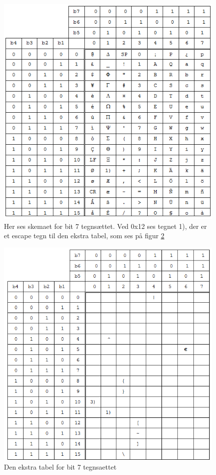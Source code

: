 \begin{figure}[H]
\includegraphics []{Billeder/tegnsaet.png}
\caption {Her ses skemaet for bit 7 tegnsættet. Ved 0x12 ses tegnet 1), der er et escape tegn til den ekstra tabel, som ses på figur \ref{tegnsaet2}}
\label {tegnsaet}
\end{figure}

\begin{figure}[H]
\includegraphics []{Billeder/tegnsaet2.png}
\caption {Den ekstra tabel for bit 7 tegnsaettet}
\label {tegnsaet2}
\end{figure}
